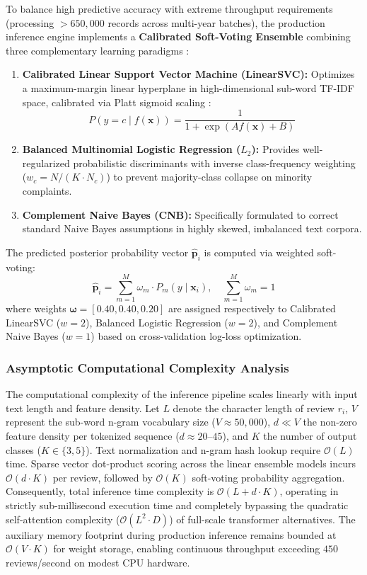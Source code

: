 \documentclass[5p,twocolumn,authoryear]{elsarticle}
\begin{document}
To balance high predictive accuracy with extreme throughput requirements (processing $>650,000$ records across multi-year batches), the production inference engine implements a \textbf{Calibrated Soft-Voting Ensemble} combining three complementary learning paradigms \citep{kuncheva2004combining}:
\begin{enumerate}
    \item \textbf{Calibrated Linear Support Vector Machine (LinearSVC):} Optimizes a maximum-margin linear hyperplane in high-dimensional sub-word TF-IDF space, calibrated via Platt sigmoid scaling \citep{niculescu2005predicting}:
    \begin{equation}
    P(y = c \mid f(\mathbf{x})) = \frac{1}{1 + \exp(A f(\mathbf{x}) + B)}
    \end{equation}
    \item \textbf{Balanced Multinomial Logistic Regression ($L_2$):} Provides well-regularized probabilistic discriminants with inverse class-frequency weighting ($w_c = N / (K \cdot N_c)$) to prevent majority-class collapse on minority complaints.
    \item \textbf{Complement Naive Bayes (CNB):} Specifically formulated to correct standard Naive Bayes assumptions in highly skewed, imbalanced text corpora.
\end{enumerate}

The predicted posterior probability vector $\hat{\mathbf{p}}_i$ is computed via weighted soft-voting:
\begin{equation}
\hat{\mathbf{p}}_i = \sum_{m=1}^M \omega_m \cdot P_m(y \mid \mathbf{x}_i), \quad \sum_{m=1}^M \omega_m = 1
\end{equation}
where weights $\boldsymbol{\omega} = [0.40, 0.40, 0.20]$ are assigned respectively to Calibrated LinearSVC ($w=2$), Balanced Logistic Regression ($w=2$), and Complement Naive Bayes ($w=1$) based on cross-validation log-loss optimization.

\subsubsection{Asymptotic Computational Complexity Analysis}
The computational complexity of the inference pipeline scales linearly with input text length and feature density. Let $L$ denote the character length of review $r_i$, $V$ represent the sub-word n-gram vocabulary size ($V \approx 50{,}000$), $d \ll V$ the non-zero feature density per tokenized sequence ($d \approx 20\text{--}45$), and $K$ the number of output classes ($K \in \{3, 5\}$). Text normalization and n-gram hash lookup require $\mathcal{O}(L)$ time. Sparse vector dot-product scoring across the linear ensemble models incurs $\mathcal{O}(d \cdot K)$ per review, followed by $\mathcal{O}(K)$ soft-voting probability aggregation. Consequently, total inference time complexity is $\mathcal{O}(L + d \cdot K)$, operating in strictly sub-millisecond execution time and completely bypassing the quadratic self-attention complexity ($\mathcal{O}(L^2 \cdot D)$) of full-scale transformer alternatives. The auxiliary memory footprint during production inference remains bounded at $\mathcal{O}(V \cdot K)$ for weight storage, enabling continuous throughput exceeding $450$ reviews/second on modest CPU hardware.
\end{document}
